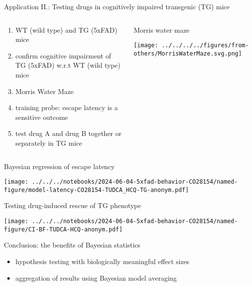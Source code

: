\documentclass[aspectratio=169]{beamer}
\begin{document}
\begin{frame}{Application II.: Testing drugs in cognitively impaired transgenic (TG) mice}
  \small
\begin{columns}[t]
\begin{column}{0.5\textwidth}
\begin{enumerate}
  \item WT (wild type) and TG (5xFAD) mice
  \item confirm cognitive impairment of TG (5xFAD) w.r.t WT (wild type) mice
  \item Morris Water Maze
  \item training probe: \alert{escape latency} is a sensitive outcome
  \item test drug A and drug B together or separately in TG mice
\end{enumerate}
\end{column}

\begin{column}{0.5\textwidth}
  Morris water maze

\texttt{[image: ../../../../figures/from-others/MorrisWaterMaze.svg.png]}
\end{column}
\end{columns}
\end{frame}

\begin{frame}{Bayesian regression of escape latency}

  \begin{center}
  \texttt{[image: ../../../notebooks/2024-06-04-5xfad-behavior-CO28154/named-figure/model-latency-CO28154-TUDCA\_HCQ-TG-anonym.pdf]}
  \end{center}
\end{frame}

\begin{frame}{Testing drug-induced rescue of TG phenotype}

  \begin{center}
  \texttt{[image: ../../../notebooks/2024-06-04-5xfad-behavior-CO28154/named-figure/CI-BF-TUDCA-HCQ-anonym.pdf]}
  \end{center}
\end{frame}

\begin{frame}{Conclusion: the benefits of Bayesian statistics}
\begin{itemize}
  \item hypothesis testing with biologically meaningful effect sizes
  \item aggregation of results using Bayesian model averaging
\end{itemize}
\end{frame}
\end{document}
